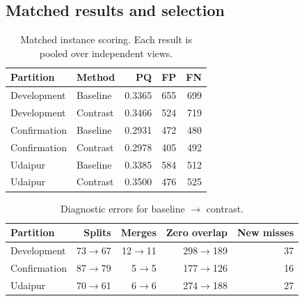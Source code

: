 \subsection{Matched results and selection}

\begin{table}[h]\centering\small

\caption{Matched instance scoring. Each result is pooled over independent views.}

\begin{tabular}{llrrr}

\toprule

Partition & Method & PQ & FP & FN\\

\midrule

Development & Baseline & 0.3365 & 655 & 699\\

Development & Contrast & 0.3466 & 524 & 719\\

Confirmation & Baseline & 0.2931 & 472 & 480\\

Confirmation & Contrast & 0.2978 & 405 & 492\\

Udaipur & Baseline & 0.3385 & 584 & 512\\

Udaipur & Contrast & 0.3500 & 476 & 525\\

\bottomrule

\end{tabular}

\end{table}

\begin{table}[h]\centering\small

\caption{Diagnostic errors for baseline \(\rightarrow\) contrast.}

\begin{tabular}{lrrrr}

\toprule

Partition & Splits & Merges & Zero overlap & New misses\\

\midrule

Development & 73\(\to\)67 & 12\(\to\)11 & 298\(\to\)189 & 37\\

Confirmation & 87\(\to\)79 & 5\(\to\)5 & 177\(\to\)126 & 16\\

Udaipur & 70\(\to\)61 & 6\(\to\)6 & 274\(\to\)188 & 27\\

\bottomrule

\end{tabular}

\end{table}

